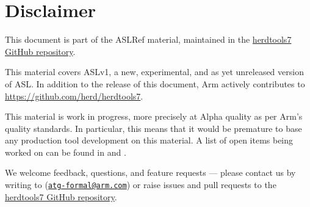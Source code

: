 \chapter{Disclaimer}

This document is part of the ASLRef material, maintained in the
\href{https://github.com/herd/herdtools7}{herdtools7 GitHub repository}.

This material covers ASLv1, a new, experimental, and as yet unreleased version of ASL.
In addition to the release of this document, Arm actively contributes to
\url{https://github.com/herd/herdtools7}.

This material is work in progress, more precisely at Alpha quality as
per Arm’s quality standards. In particular, this means that it would be
premature to base any production tool development on this material.
A list of open items being worked on can be found in 
and .

We welcome feedback, questions, and feature requests — please contact us by writing
to (\href{mailto:atg-formal@arm.com}{\tt atg-formal@arm.com}) or raise issues and
pull requests to the \href{https://github.com/herd/herdtools7}{herdtools7 GitHub repository}.
